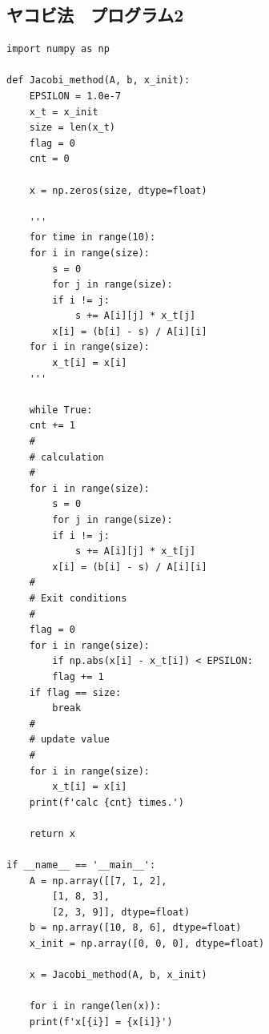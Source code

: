 \documentclass[a4paper, titlepage]{jsarticle}
\begin{document}
		\subsection{ヤコビ法　プログラム2}
			\begin{lstlisting}
import numpy as np

def Jacobi_method(A, b, x_init):
    EPSILON = 1.0e-7
    x_t = x_init
    size = len(x_t)
    flag = 0
    cnt = 0

    x = np.zeros(size, dtype=float)

    '''
    for time in range(10):
	for i in range(size):
	    s = 0
	    for j in range(size):
		if i != j:
		    s += A[i][j] * x_t[j]
	    x[i] = (b[i] - s) / A[i][i]
	for i in range(size):
	    x_t[i] = x[i]
    '''

    while True:
	cnt += 1
	#
	# calculation
	#
	for i in range(size):
	    s = 0
	    for j in range(size):
		if i != j:
		    s += A[i][j] * x_t[j]
	    x[i] = (b[i] - s) / A[i][i]
	#
	# Exit conditions
	#
	flag = 0
	for i in range(size):
	    if np.abs(x[i] - x_t[i]) < EPSILON:
		flag += 1
	if flag == size:
	    break
	#
	# update value
	#
	for i in range(size):
	    x_t[i] = x[i]
    print(f'calc {cnt} times.')

    return x

if __name__ == '__main__':
    A = np.array([[7, 1, 2],
		[1, 8, 3],
		[2, 3, 9]], dtype=float)
    b = np.array([10, 8, 6], dtype=float)
    x_init = np.array([0, 0, 0], dtype=float)

    x = Jacobi_method(A, b, x_init)

    for i in range(len(x)):
	print(f'x[{i}] = {x[i]}')
			\end{lstlisting}
\end{document}
